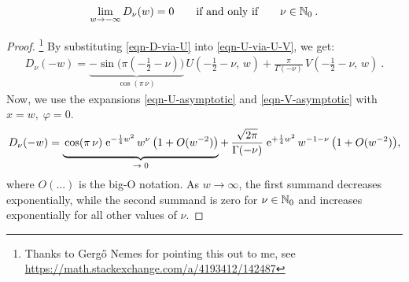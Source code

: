\begin{lemma}
	\begin{equation*}
		\lim_{w \to -\infty} D_\nu(w) = 0
		\qquad \text{if and only if} \qquad
		\nu \in \mathbb{N}_0
		\: .
	\end{equation*}
	\label{lemma-parabolic-cylinder-asymp}
\end{lemma}
\begin{proof}
	\footnote{Thanks to Gergő Nemes for pointing this out to me, see \url{https://math.stackexchange.com/a/4193412/142487}}
	By substituting \eqref{eqn-D-via-U} into \eqref{eqn-U-via-U-V}, we get:
	\begin{align*}
		D_\nu(-w)
		= \underbrace{- \sin\big(\pi(-\tfrac{1}{2} - \nu)\big)}_{\cos(\pi \, \nu)}
		\, U(-\tfrac{1}{2} - \nu, \, w)
		+ \frac{\pi}{\Gamma(-\nu)}
		\, V(-\tfrac{1}{2} - \nu, \, w)
		\: .
	\end{align*}
	Now, we use the expansions \eqref{eqn-U-asymptotic} and \eqref{eqn-V-asymptotic} with $x = w, \; \varphi = 0$.
	\begin{align*}
		D_\nu(-w)
		=
		\underbrace{
			\vph{\frac{A}{B}}
			\cos(\pi \, \nu)
			\; \e{-\frac{1}{4} w^2}
			\, w^\nu
			\, \big( 1 + O(w^{-2}) \big)
		}_{\to \; 0}
		+\, \frac{\sqrt{2\pi}}{\Gamma(-\nu)}
		\; \e{+\frac{1}{4} w^2}
		\, w^{-1-\nu}
		\, \big( 1 + O(w^{-2})\big) ,
	\end{align*}
	where $O(...)$ is the big-O notation. As $w \to \infty$, the first summand decreases exponentially, while the second summand is zero for $\nu\in\mathbb{N}_0$ and increases exponentially for all other values of $\nu$.
\end{proof}